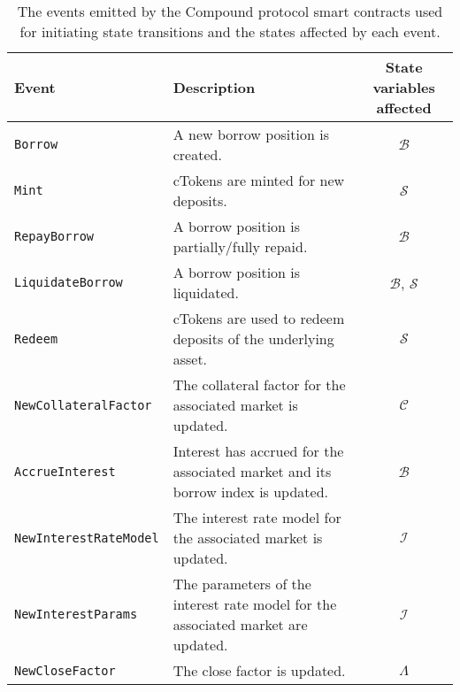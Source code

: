 
\begin{table}[tb]
  \centering
  \caption[Events emitted by the Compound protocol]{The events emitted by the Compound protocol smart contracts used for initiating state transitions and the states affected by each event.}
\label{tab:compound-events}
  \small
  \setlength{\tabcolsep}{1.5pt}
  \begin{tabular}{lp{6cm}c}
    \toprule
    {\bf Event} & {\bf Description} &
    {\bf State variables affected}\\

    \midrule
    \texttt{Borrow}  & A new borrow position is created. & $\mathcal{B}$  \\ 
    \texttt{Mint} & cTokens are minted for new deposits. &  $\mathcal{S}$           \\
    \texttt{RepayBorrow} & A borrow position is partially/fully repaid.& $\mathcal{B}$            \\ 
    \texttt{LiquidateBorrow} & A borrow position is liquidated. & $\mathcal{B}$, $\mathcal{S}$             \\
    \texttt{Redeem} & cTokens are used to redeem deposits of the underlying asset. & $\mathcal{S}$ \\
    \texttt{NewCollateralFactor} & The collateral factor for the associated market is updated. & $\mathcal{C}$   \\
    \texttt{AccrueInterest} & Interest has accrued for the associated market and its borrow index is updated. & $\mathcal{B}$            \\
    \texttt{NewInterestRateModel} & The interest rate model for the associated market is updated. & $\mathcal{I}$             \\
    \texttt{NewInterestParams} & The parameters of the interest rate model for the associated market are updated. & $\mathcal{I}$            \\
    \texttt{NewCloseFactor} & The close factor is updated. &     $\Lambda$   \\
    \bottomrule
  \end{tabular}
\end{table}
